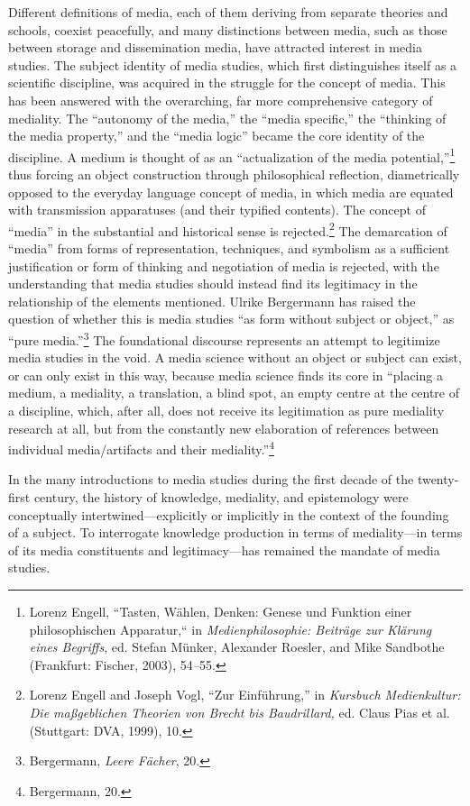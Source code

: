 \documentclass{tufte-handout}
\begin{document}
Different definitions of media, each of them deriving from separate
theories and schools, coexist peacefully, and many distinctions between
media, such as those between storage and dissemination media, have
attracted interest in media studies. The subject identity of media
studies, which first distinguishes itself as a scientific discipline,
was acquired in the struggle for the concept of media. This has been
answered with the overarching, far more comprehensive category of
mediality. The ``autonomy of the media,'' the ``media specific,'' the
``thinking of the media property,'' and the ``media logic'' became the
core identity of the discipline. A medium is thought of as an
``actualization of the media potential,''\footnote{Lorenz Engell,
  ``Tasten, Wählen, Denken: Genese und Funktion einer philosophischen
  Apparatur,`` in \emph{Medienphilosophie: Beiträge zur Klärung eines
  Begriffs}, ed. Stefan Münker, Alexander Roesler, and Mike Sandbothe
  (Frankfurt: Fischer, 2003), 54\emph{--}55.} thus forcing an object
construction through philosophical reflection, diametrically opposed to
the everyday language concept of media, in which media are equated with
transmission apparatuses (and their typified contents). The concept of
``media'' in the substantial and historical sense is
rejected.\footnote{Lorenz Engell and Joseph Vogl, ``Zur Einführung,'' in
  \emph{Kursbuch Medienkultur: Die maßgeblichen Theorien von Brecht bis
  Baudrillard,} ed. Claus Pias et al. (Stuttgart: DVA, 1999), 10.} The
demarcation of ``media'' from forms of representation, techniques, and
symbolism as a sufficient justification or form of thinking and
negotiation of media is rejected, with the understanding that media
studies should instead find its legitimacy in the relationship of the
elements mentioned. Ulrike Bergermann has raised the question of whether
this is media studies ``as form without subject or object,'' as ``pure
media.''\footnote{Bergermann, \emph{Leere Fächer}, 20.} The foundational
discourse represents an attempt to legitimize media studies in the void.
A media science without an object or subject can exist, or can only
exist in this way, because media science finds its core in ``placing a
medium, a mediality, a translation, a blind spot, an empty centre at the
centre of a discipline, which, after all, does not receive its
legitimation as pure mediality research at all, but from the constantly
new elaboration of references between individual media/artifacts and
their mediality.''\footnote{Bergermann, 20.}

In the many introductions to media studies during the first decade of
the twenty-first century, the history of knowledge, mediality, and
epistemology were conceptually intertwined---explicitly or implicitly in
the context of the founding of a subject. To interrogate knowledge
production in terms of mediality---in terms of its media constituents
and legitimacy---has remained the mandate of media studies.
\end{document}
